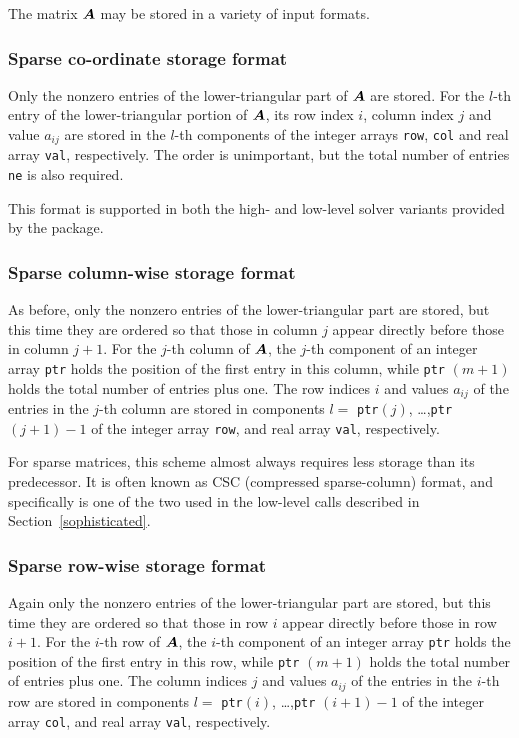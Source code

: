 \documentclass{galahad}
\begin{document}

\galmatrix
The matrix ${\bm{A}}$ may be stored in a variety of input formats.

\subsubsection{Sparse co-ordinate storage format}\label{coordinate}
Only the nonzero entries of the lower-triangular part of ${\bm{A}}$ are stored.
For the $l$-th entry of the lower-triangular portion of ${\bm{A}}$,
its row index $i$, column index $j$ and value $a_{ij}$
are stored in the $l$-th components of the integer arrays {\tt row},
{\tt col} and real array {\tt val}, respectively.
The order is unimportant, but the total number of entries
{\tt ne} is also required. 

\noindent
This format is supported in both the high- and low-level solver variants
provided by the package.

\subsubsection{Sparse column-wise storage format}\label{columnwise}
As before,
only the nonzero entries of the lower-triangular part are stored,
but this time they are ordered so that those in column $j$ appear directly
before those in column $j+1$. For the $j$-th column of ${\bm{A}}$, the $j$-th 
component of an integer array {\tt ptr} holds the position of the first entry 
in this column, while {\tt ptr} $(m+1)$ holds the total number of entries 
plus one. The row indices $i$ and values $a_{ij}$ of the entries in the 
$j$-th column are stored in components 
$l =$ {\tt ptr}$(j)$, \ldots ,{\tt ptr} $(j+1)-1$ of the
integer array {\tt row}, and real array {\tt val}, respectively.

\noindent
For sparse matrices, this scheme almost always requires less storage than
its predecessor. It is often known as CSC (compressed sparse-column) format,
and specifically is one of the two used in the low-level calls described
in Section~\ref{sophisticated}.

\subsubsection{Sparse row-wise storage format}\label{rowwise}
Again only the nonzero entries of the lower-triangular part are stored,
but this time they are ordered so that those in row $i$ appear directly
before those in row $i+1$. For the $i$-th row of ${\bm{A}}$, the $i$-th component
of an integer array {\tt ptr} holds the position of the first entry in this
row, while {\tt ptr} $(m+1)$ holds the total number of entries plus one.
The column indices $j$ and values $a_{ij}$ of the entries in the $i$-th row
are stored in components
$l =$ {\tt ptr}$(i)$, \ldots ,{\tt ptr} $(i+1)-1$ of the
integer array {\tt col}, and real array {\tt val}, respectively.
\end{document}
